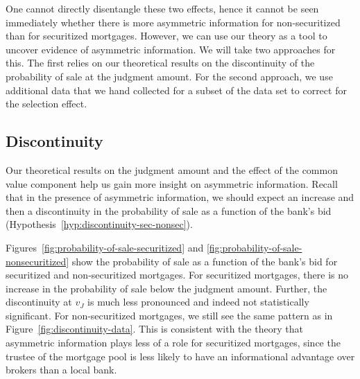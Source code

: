 \documentclass[11pt,twopage]{article}
\begin{document}
One cannot directly disentangle these two effects, hence it cannot be
seen immediately whether there is more asymmetric information for
non-securitized than for securitized mortgages. However, we can use
our theory as a tool to uncover evidence of asymmetric information. We
will take two approaches for this. The first relies on our theoretical
results on the discontinuity of the probability of sale at the
judgment amount. For the second approach, we use additional data that
we hand collected for a subset of the data set to correct for the selection
effect.

\subsection{Discontinuity}


Our theoretical results on the judgment amount and the effect of the
common value component help us gain more insight on asymmetric
information. Recall that in the presence of asymmetric information, we
should expect an increase and then a discontinuity in the probability
of sale as a function of the bank's bid
(Hypothesis~\ref{hyp:discontinuity-sec-nonsec}).

Figures~\ref{fig:probability-of-sale-securitized} and
\ref{fig:probability-of-sale-nonsecuritized} show the probability of
sale as a function of the bank's bid for securitized and
non-securitized mortgages. For securitized mortgages, there is no
increase in the probability of sale below the judgment
amount. Further, the discontinuity at $v_J$ is much less pronounced
and indeed not statistically significant. For non-securitized
mortgages, we still see the same pattern as in
Figure~\ref{fig:discontinuity-data}. This is consistent with the
theory that asymmetric information plays less of a role for
securitized mortgages, since the trustee of the mortgage pool is less
likely to have an informational advantage over brokers than a local
bank.
\end{document}
